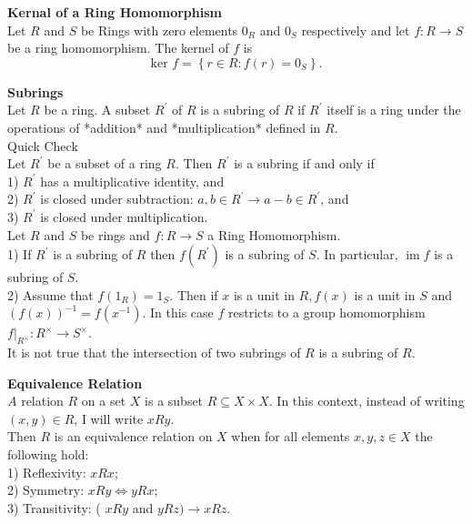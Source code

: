\documentclass[a4paper, 10pt]{article}
\begin{document}
\begin{multicols*}{3}
\textbf{Kernal of a Ring Homomorphism}\\
Let $R$ and $S$ be Rings with zero elements $0_R$ and $0_S$ respectively and let $f: R \rightarrow S$ be a ring homomorphism. 
The kernel of $f$ is
$$
\text { ker } f=\left\{r \in R: f(r)=0_S\right\} \text {. }
$$

\textbf{Subrings}\\
Let $R$ be a ring. A subset $R^{\prime}$ of $R$ is a subring of $R$ if $R^{\prime}$ itself is a ring under the operations of *addition* and *multiplication* defined in $R$.\\
Quick Check\\
Let $R^{\prime}$ be a subset of a ring $R$. Then $R^{\prime}$ is a subring if and only if\\
1) $R^{\prime}$ has a multiplicative identity, and\\
2) $R^{\prime}$ is closed under subtraction: $a, b \in R^{\prime} \rightarrow a-b \in R^{\prime}$, and\\
3) $R^{\prime}$ is closed under multiplication.\\
Let $R$ and $S$ be rings and $f: R \longrightarrow S$ a Ring Homomorphism.\\
1) If $R^{\prime}$ is a subring of $R$ then $f\left(R^{\prime}\right)$ is a subring of $S$. In particular, $\operatorname{im} f$ is a subring of $S$.\\
2) Assume that $f\left(1_R\right)=1_S$. Then if $x$ is a unit in $R, f(x)$ is a unit in $S$ and $(f(x))^{-1}=f\left(x^{-1}\right)$. In this case $f$ restricts to a group homomorphism $\left.f\right|_{R^{\times}}: R^{\times} \rightarrow S^{\times}$.\\
It is not true that the intersection of two subrings of $R$ is a subring of $R$.

\textbf{Equivalence Relation}\\
$A$ relation $R$ on a set $X$ is a subset $R \subseteq X \times X$. In this context, instead of writing $(x, y) \in R$, I will write $x R y$. \\
Then $R$ is an equivalence relation on $X$ when for all elements $x, y, z \in X$ the following hold:\\
1) Reflexivity: $x R x$;\\
2) Symmetry: $x R y \Leftrightarrow y R x$;\\
3) Transitivity: ( $x R y$ and $y R z) \rightarrow x R z$.\\


\end{multicols*}
\end{document}
